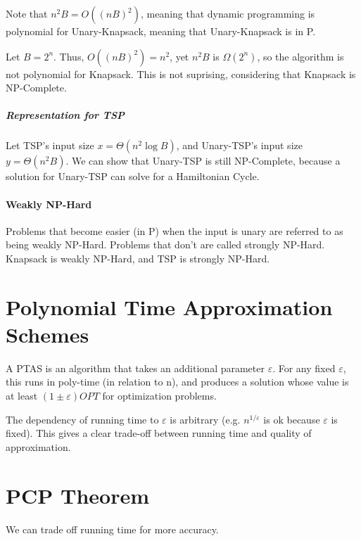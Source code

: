 \documentclass[a4paper]{article}
\begin{document}
Note that $n^2B=O((nB)^2)$, meaning that dynamic programming is polynomial for Unary-Knapsack, meaning that Unary-Knapsack is in P.

Let $B=2^n$. Thus, $O((nB)^2)=n^2$, yet $n^2B$ is $\Omega(2^n)$, so the algorithm is not polynomial for Knapsack. This is not suprising, considering that Knapsack is NP-Complete.

\subparagraph{Representation for TSP}
Let TSP's input size $x=\Theta(n^2\log B)$, and Unary-TSP's input size $y=\Theta(n^2B)$. We can show that Unary-TSP is still NP-Complete, because a solution for Unary-TSP can solve for a Hamiltonian Cycle.

\paragraph{Weakly NP-Hard}
Problems that become easier (in P) when the input is unary are referred to as being weakly NP-Hard. Problems that don't are called strongly NP-Hard. Knapsack is weakly NP-Hard, and TSP is strongly NP-Hard.

\section{Polynomial Time Approximation Schemes}
A PTAS is an algorithm that takes an additional parameter $\varepsilon$. For any fixed $\varepsilon$, this runs in poly-time (in relation to n), and produces a solution whose value is at least $(1\pm\varepsilon)OPT$ for optimization problems.

The dependency of running time to $\varepsilon$ is arbitrary (e.g. $n^{1/\varepsilon}$ is ok because $\varepsilon$ is fixed).
This gives a clear trade-off between running time and quality of approximation.

\section{PCP Theorem}
We can trade off running time for more accuracy.
\end{document}
